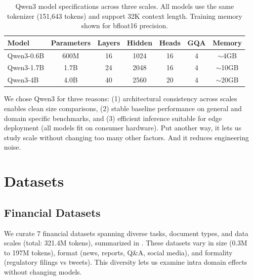 \begin{table}[h]
\centering
\caption[Qwen3 Model Specifications]{Qwen3 model specifications across three scales. All models use the same tokenizer (151,643 tokens) and support 32K context length. Training memory shown for bfloat16 precision.}
\label{tab:model_specs}
\begin{tabular}{lcccccc}
\toprule
\textbf{Model} & \textbf{Parameters} & \textbf{Layers} & \textbf{Hidden} & \textbf{Heads} & \textbf{GQA} & \textbf{Memory} \\
\midrule
Qwen3-0.6B & 600M & 16 & 1024 & 16 & 4 & $\sim$4GB \\
Qwen3-1.7B & 1.7B & 24 & 2048 & 16 & 4 & $\sim$10GB \\
Qwen3-4B & 4.0B & 40 & 2560 & 20 & 4 & $\sim$20GB \\
\bottomrule
\end{tabular}
\end{table}

We chose Qwen3 for three reasons: (1) architectural consistency across scales enables clean size comparisons, (2) stable baseline performance on general and domain specific benchmarks, and (3) efficient inference suitable for edge deployment (all models fit on consumer hardware). Put another way, it lets us study scale without changing too many other factors. And it reduces engineering noise.

\section{Datasets}

\subsection{Financial Datasets}

We curate 7 financial datasets spanning diverse tasks, document types, and data scales (total: 321.4M tokens), summarized in . These datasets vary in size (0.3M to 197M tokens), format (news, reports, Q\&A, social media), and formality (regulatory filings vs tweets). This diversity lets us examine intra domain effects without changing models.

